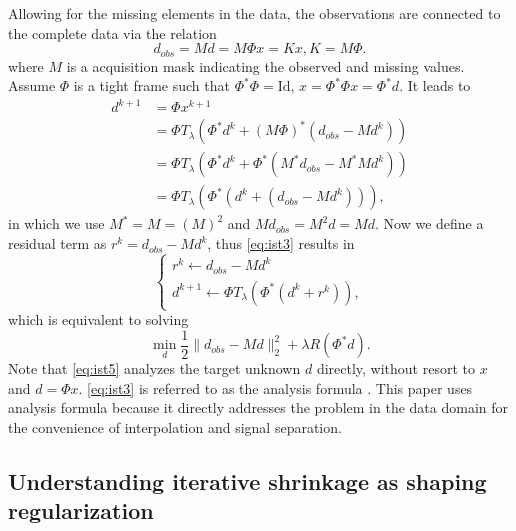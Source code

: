 Allowing for the missing elements in the data, the observations are connected to the complete data via the relation
\begin{equation}
 d_{obs}=Md=M\Phi x=Kx, K=M\Phi.
 \end{equation}
where $M$ is a acquisition mask indicating the observed and missing values. Assume $\Phi$ is a tight frame such that $\Phi^*\Phi=\mathrm{Id}$, $x=\Phi^*\Phi x=\Phi^*d$. It leads to
\begin{equation}\label{eq:ist3}
  \begin{array}{ll}
    d^{k+1} & =\Phi x^{k+1} \\
      & =\Phi T_{\lambda}(\Phi^*d^{k}+(M\Phi)^*(d_{obs}-Md^{k})) \\
      & =\Phi T_{\lambda}(\Phi^*d^{k}+\Phi^*(M^*d_{obs}-M^*Md^{k})) \\
      & =\Phi T_{\lambda}(\Phi^*(d^{k}+(d_{obs}-Md^{k}))),
  \end{array}
\end{equation}
in which we use $M^*=M=(M)^2$ and $Md_{obs}=M^2d=Md$. Now we define a residual term as $r^{k}=d_{obs}-Md^{k}$, thus \eqref{eq:ist3} results in
\begin{equation}\label{eq:ist4}
  \left\{
  \begin{array}{l}
    r^{k}\leftarrow d_{obs}-Md^{k} \\
    d^{k+1}\leftarrow \Phi T_{\lambda}(\Phi^*(d^{k}+r^{k})),
  \end{array}
  \right.
\end{equation}
which is equivalent to solving
\begin{equation}\label{eq:ist5}
  \min\limits_{d}\frac{1}{2}\|d_{obs}-Md\|_2^2+\lambda R(\Phi^{*}d).
\end{equation}
Note that \eqref{eq:ist5} analyzes the target unknown $d$ directly, without resort to $x$ and $d=\Phi x$. \eqref{eq:ist3} is referred to as the analysis formula \citep{elad2007analysis}. This paper uses analysis formula because it directly addresses the problem in the data domain for the convenience of interpolation and signal separation.


\subsection{Understanding iterative shrinkage as shaping regularization}

